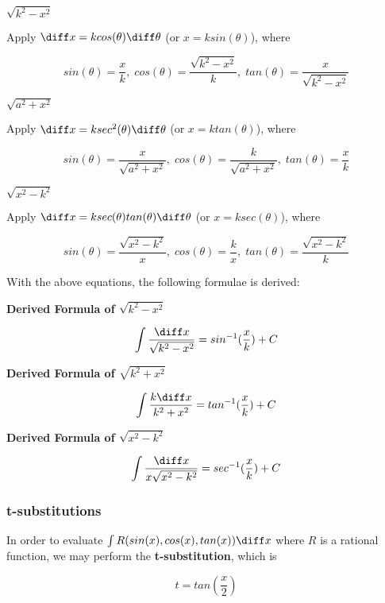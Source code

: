 \begin{alist}
  \item $\sqrt{k^{2}-x^{2}}$\s

  Apply $\diff x=kcos(\theta)\diff \theta$ (or $x=ksin(\theta)$), where

  $$sin(\theta)=\frac{x}{k},\; cos(\theta)=\frac{\sqrt{k^{2}-x^{2}}}{k},\; tan(\theta)=\frac{x}{\sqrt{k^{2}-x^{2}}}$$

  \item $\sqrt{a^{2}+x^{2}}$\s

  Apply $\diff x=ksec^{2}(\theta)\diff \theta$ (or $x=ktan(\theta)$), where

  $$sin(\theta)=\frac{x}{\sqrt{a^{2}+x^{2}}},\; cos(\theta)=\frac{k}{\sqrt{a^{2}+x^{2}}},\; tan(\theta)=\frac{x}{k}$$

  \item $\sqrt{x^{2}-k^{2}}$\s

  Apply $\diff x=ksec(\theta)tan(\theta)\diff \theta$ (or $x=ksec(\theta)$), where

  $$sin(\theta)=\frac{\sqrt{x^{2}-k^{2}}}{x},\; cos(\theta)=\frac{k}{x},\; tan(\theta)=\frac{\sqrt{x^{2}-k^{2}}}{k}$$
\end{alist}

With the above equations, the following formulae is derived:

\begin{alist}
  \item \textbf{Derived Formula of $\sqrt{k^{2}-x^{2}}$}

  $$\int\frac{\diff x}{\sqrt{k^{2}-x^{2}}}=sin^{-1}(\frac{x}{k})+C$$

  \item \textbf{Derived Formula of $\sqrt{k^{2}+x^{2}}$}

  $$\int\frac{k\diff x}{k^{2}+x^{2}}=tan^{-1}(\frac{x}{k})+C$$

  \item \textbf{Derived Formula of $\sqrt{x^{2}-k^{2}}$}

  $$\int\frac{\diff x}{x\sqrt{x^{2}-k^{2}}}=sec^{-1}(\frac{x}{k})+C$$
\end{alist}

\subsubsection{t-substitutions}
In order to evaluate $\int R(sin(x),cos(x),tan(x))\diff x$ where $R$ is a rational function, we may perform the \textbf{t-substitution}, which is

$$t=tan\left( \frac{x}{2}\right)$$\s

